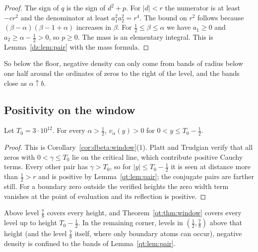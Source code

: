 \begin{proof}
The sign of $q$ is the sign of $d^2+p$. For $|d|<r$ the numerator is at least $-cr^2$ and the denominator at least $a_1^2a_2^2=r^4$. The bound on $r^2$ follows because $(\beta-\alpha)(\beta-1+\alpha)$ increases in $\beta$. For $\frac12\le\beta\le\alpha$ we have $a_1\ge0$ and $a_2\ge\alpha-\frac12>0$, so $p\ge0$. The mass is an elementary integral. This is Lemma~\ref{dz:lem:pair} with the mass formula.
\end{proof}

So below the floor, negative density can only come from bands of radius below one half around the ordinates of zeros to the right of the level, and the bands close as $\alpha\uparrow b$.

\subsection{Positivity on the window}\label{qt:sec:window}

\begin{theorem}\label{qt:thm:window}
Let $T_0=3\cdot10^{12}$. For every $\alpha>\frac12$, $v_\alpha(y)>0$ for $0<y\le T_0-\frac12$.
\end{theorem}

\begin{proof}
This is Corollary~\ref{cor:dbeta:window}(1). Platt and Trudgian \cite{PT21} verify that all zeros with $0<\gamma\le T_0$ lie on the critical line, which contribute positive Cauchy terms. Every other pair has $\gamma>T_0$, so for $|y|\le T_0-\frac12$ it is seen at distance more than $\frac12>r$ and is positive by Lemma~\ref{qt:lem:pair}; the conjugate pairs are farther still. For a boundary zero outside the verified heights the zero width term vanishes at the point of evaluation and its reflection is positive.
\end{proof}

Above level $\frac78$ \cite{OAI26a} covers every height, and Theorem~\ref{qt:thm:window} covers every level up to height $T_0-\frac12$. In the remaining corner, levels in $(\frac12,\frac78)$ above that height (and the level $\frac78$ itself, where only boundary atoms can occur), negative density is confined to the bands of Lemma~\ref{qt:lem:pair}.

